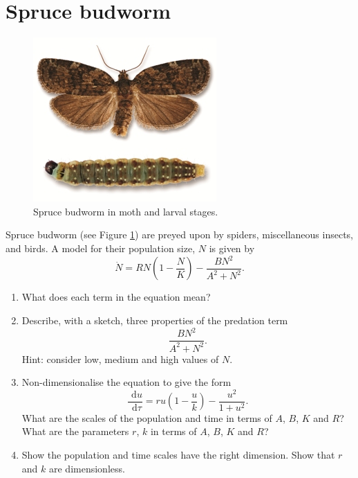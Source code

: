 \documentclass[]{article}
\newcommand{\bb}{\begin{equation}}
\newcommand{\ee}{\end{equation}}
\newcommand{\rd}{\text{ d}}
\newcommand{\see}[1]{(see Figure \ref{#1})}
\newcommand{\ttp}{.45\textwidth}
\renewcommand{\l}{\left(}
\renewcommand{\r}{\right)}
\begin{document}
\section{Spruce budworm}
\begin{figure}[h!!!tb]
\centering
\includegraphics[width=\ttp]{../../Pictures/Spruce_budworm.jpg}
\caption{\label{Spruce_budworm} Spruce budworm in moth and larval stages.}
\end{figure}
Spruce budworm \see{Spruce_budworm} are preyed upon by spiders, miscellaneous insects, and birds. A model for their population size, $N$ is given by
\bb
\dot{N}=RN\l 1-\frac{N}{K}\r-\frac{BN^2}{A^2+N^2}.
\ee
\begin{enumerate}
\item What does each term in the equation mean?
\item Describe, with a sketch, three properties of the predation term
\bb
\frac{BN^2}{A^2+N^2}.
\ee
Hint: consider low, medium and high values of $N$.
\item Non-dimensionalise the equation to give the form
\bb
\frac{\rd u}{\rd \tau}=ru\l 1-\frac{u}{k}\r-\frac{u^2}{1+u^2}.
\ee
What are the scales of the population and time in terms of $A$, $B$, $K$ and $R$? What are the parameters $r$, $k$ in terms of $A$, $B$, $K$ and $R$?
\item Show the population and time scales have the right dimension. Show that $r$ and $k$ are dimensionless.
\end{enumerate}
\end{document}
